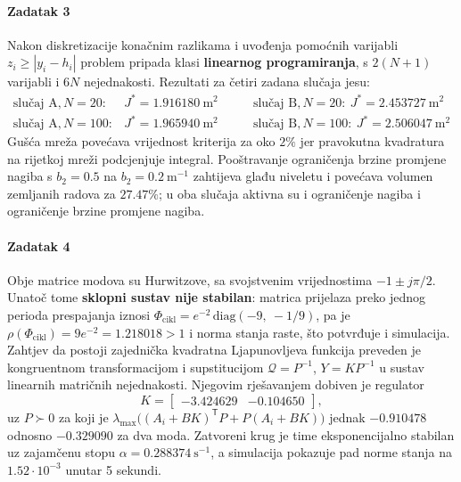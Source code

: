\paragraph{Zadatak 3}
Nakon diskretizacije konačnim razlikama i uvođenja pomoćnih varijabli $z_i \geq |y_i - h_i|$ problem pripada klasi \textbf{linearnog programiranja}, s $2(N+1)$ varijabli i $6N$ nejednakosti. Rezultati za četiri zadana slučaja jesu:
\begin{equation*}
\begin{array}{lcc}
\text{slučaj A}, N = 20:  & J^* = 1.916180\ \mathrm{m}^2 \qquad & \text{slučaj B}, N = 20:  \ J^* = 2.453727\ \mathrm{m}^2 \\
\text{slučaj A}, N = 100: & J^* = 1.965940\ \mathrm{m}^2 \qquad & \text{slučaj B}, N = 100: \ J^* = 2.506047\ \mathrm{m}^2
\end{array}
\end{equation*}
Gušća mreža povećava vrijednost kriterija za oko $2\%$ jer pravokutna kvadratura na rijetkoj mreži podcjenjuje integral. Pooštravanje ograničenja brzine promjene nagiba s $b_2 = 0.5$ na $b_2 = 0.2\ \mathrm{m}^{-1}$ zahtijeva glađu niveletu i povećava volumen zemljanih radova za $27.47\%$; u oba slučaja aktivna su i ograničenje nagiba i ograničenje brzine promjene nagiba.

\paragraph{Zadatak 4}
Obje matrice modova su Hurwitzove, sa svojstvenim vrijednostima $-1 \pm j\pi/2$. Unatoč tome \textbf{sklopni sustav nije stabilan}: matrica prijelaza preko jednog perioda prespajanja iznosi $\Phi_{\mathrm{cikl}} = e^{-2}\,\mathrm{diag}(-9,\ -1/9)$, pa je $\rho(\Phi_{\mathrm{cikl}}) = 9e^{-2} = 1.218018 > 1$ i norma stanja raste, što potvrđuje i simulacija. Zahtjev da postoji zajednička kvadratna Ljapunovljeva funkcija preveden je kongruentnom transformacijom i supstitucijom $\mathcal{Q} = P^{-1}$, $Y = KP^{-1}$ u sustav linearnih matričnih nejednakosti. Njegovim rješavanjem dobiven je regulator
\begin{equation*}
K = \begin{bmatrix} -3.424629 & -0.104650 \end{bmatrix},
\end{equation*}
uz $P \succ 0$ za koji je $\lambda_{\max}\big((A_i + BK)^{\mathsf{T}} P + P(A_i + BK)\big)$ jednak $-0.910478$ odnosno $-0.329090$ za dva moda. Zatvoreni krug je time eksponencijalno stabilan uz zajamčenu stopu $\alpha = 0.288374\ \mathrm{s}^{-1}$, a simulacija pokazuje pad norme stanja na $1.52 \cdot 10^{-3}$ unutar 5 sekundi.

